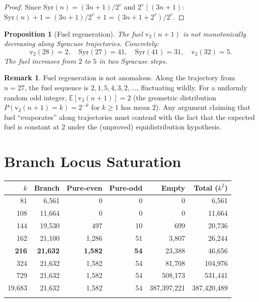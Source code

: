 \documentclass{CUP-JNL-FMP}%
\newtheorem{proposition}[theorem]{Proposition}
\theoremstyle{definition}
\newtheorem{remark}[theorem]{Remark}
\numberwithin{equation}{section}
\newcommand{\Syr}{\mathrm{Syr}}
\newcommand{\val}{\mathrm{v}_2}
\begin{document}
\begin{proof}
  Since $\Syr(n) = (3n+1)/2^v$ and $2^v \mid (3n+1)$:
  $\Syr(n) + 1 = (3n+1)/2^v + 1 = (3n+1+2^v)/2^v$.
\end{proof}

\begin{proposition}[Fuel regeneration]\label{prop:fuelregen}
  The fuel $\val(n+1)$ is not monotonically decreasing along Syracuse
  trajectories. Concretely:
  \[
    \val(28) = 2, \quad \Syr(27) = 41, \quad \Syr(41) = 31, \quad \val(32) = 5.
  \]
  The fuel increases from $2$ to $5$ in two Syracuse steps.
\end{proposition}

\begin{remark}
  Fuel regeneration is not anomalous. Along the trajectory from $n = 27$,
  the fuel sequence is $2, 1, 5, 4, 3, 2, \ldots$, fluctuating wildly.
  For a uniformly random odd integer, $\mathbb{E}[\val(n+1)] = 2$ (the
  geometric distribution $P(\val(n+1) = k) = 2^{-k}$ for $k \geq 1$ has
  mean $2$). Any argument claiming that fuel ``evaporates'' along trajectories
  must contend with the fact that the expected fuel is constant at $2$
  under the (unproved) equidistribution hypothesis.
\end{remark}


\section{Branch Locus Saturation}\label{sec:saturation}

\begin{table}[t]
\tabcolsep=4pt
{\begin{fntable}
\begin{tabular*}{\textwidth}{@{\extracolsep{\fill}}rrrrrr@{}}
\toprule
$k$ & Branch & Pure-even & Pure-odd & Empty & Total ($k^2$) \\
\midrule
81 & 6,561 & 0 & 0 & 0 & 6,561 \\
108 & 11,664 & 0 & 0 & 0 & 11,664 \\
144 & 19,530 & 497 & 10 & 699 & 20,736 \\
162 & 21,100 & 1,286 & 51 & 3,807 & 26,244 \\
\textbf{216} & \textbf{21,632} & \textbf{1,582} & \textbf{54} & 23,388 & 46,656 \\
324 & 21,632 & 1,582 & 54 & 81,708 & 104,976 \\
729 & 21,632 & 1,582 & 54 & 508,173 & 531,441 \\
19,683 & 21,632 & 1,582 & 54 & 387,397,221 & 387,420,489 \\
\botrule
\end{tabular*}
\end{fntable}}
\end{table}
\end{document}
